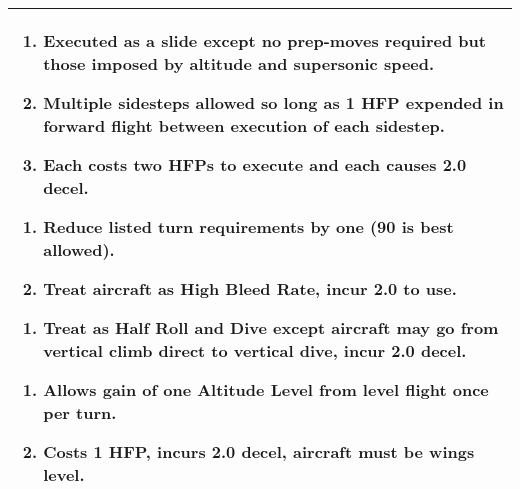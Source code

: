 \begin{twocolumntablefloat}
\begin{twocolumntable}
\begin{tabularx}{\linewidth}{P}
\begin{multicols}{2}


\begin{enumerate}[nosep]
    \item Executed as a slide except no prep-moves required but those imposed by altitude and supersonic speed.
    \item Multiple sidesteps allowed so long as 1 HFP expended in forward flight between execution of each sidestep.
    \item Each costs two HFPs to execute and each causes 2.0 decel.
\end{enumerate}


\begin{enumerate}[nosep]
    \item Reduce listed turn requirements by one (90 is best allowed).
    \item Treat aircraft as High Bleed Rate, incur 2.0 to use.
\end{enumerate}


\begin{enumerate}[nosep]
    \item Treat as Half Roll and Dive except aircraft may go from vertical climb direct to vertical dive, incur 2.0 decel.
\end{enumerate}


\begin{enumerate}[nosep]
    \item Allows gain of one Altitude Level from level flight once per turn.
    \item Costs 1 HFP, incurs 2.0 decel, aircraft must be wings level.
\end{enumerate}

\end{multicols}
\\
\bottomrule
\end{tabularx}
\end{twocolumntable}
\end{twocolumntablefloat}
